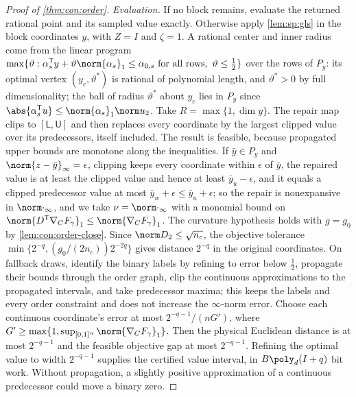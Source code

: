 \begin{proof}[Proof of \cref{thm:con:order}]
\emph{Evaluation.} If no block remains, evaluate the returned rational
point and its sampled value exactly. Otherwise apply \cref{lem:sp:gls} in the block coordinates $y$, with
$Z=I$ and $\zeta=1$. A rational center and inner radius come from the linear
program $\max\{\vartheta:\alpha_s^{\mathsf T}y+\vartheta\norm{\alpha_s}_1\le
\alpha_{0,s}\text{ for all rows},\ \vartheta\le\frac12\}$ over the rows of $P_y$:
its optimal vertex $(y_c,\vartheta^*)$ is rational of polynomial length, and
$\vartheta^*>0$ by full dimensionality; the ball of radius $\vartheta^*$ about
$y_c$ lies in $P_y$ since $\abs{\alpha_s^{\mathsf T}u}\le\norm{\alpha_s}_1\norm
u_2$. Take $R=\max\{1,\dim y\}$. The repair map clips to $[\mathsf L,\mathsf U]$
and then replaces every coordinate by the largest clipped value over its
predecessors, itself included. The result is feasible, because propagated
upper bounds are monotone along the inequalities. If $\bar y\in P_y$ and
$\norm{z-\bar y}_\infty=\epsilon$, clipping keeps every coordinate within
$\epsilon$ of $\bar y$, the repaired value is at least the clipped value and
hence at least $\bar y_u-\epsilon$, and it equals a clipped predecessor value
at most $\bar y_w+\epsilon\le\bar y_u+\epsilon$; so the repair is
nonexpansive in $\norm\cdot_\infty$, and we take $\nu=\norm\cdot_\infty$ with a
monomial bound on $\norm{D^{\mathsf T}\nabla_CF_\gamma}_1\le\norm{\nabla_CF_\gamma}_1$.
The curvature hypothesis holds with $g=g_0$ by \cref{lem:con:order-close}.
Since $\norm D_2\le\sqrt{n_c}$, the objective tolerance
$\min\{2^{-q},(g_0/(2n_c))2^{-2q}\}$ gives distance $2^{-q}$ in the original
coordinates. On fallback draws, identify the binary labels by refining to
error below $\frac12$, propagate their bounds through the order graph, clip the
continuous approximations to the propagated intervals, and take predecessor
maxima; this keeps the labels and every order constraint and does not
increase the $\infty$-norm error. Choose each continuous coordinate's error
at most $2^{-q-1}/(nG')$, where
$G'\ge\max\{1,\sup_{[0,1]^n}\norm{\nabla_CF_\gamma}_1\}$. Then the physical
Euclidean distance is at most $2^{-q-1}$ and the feasible objective gap at
most $2^{-q-1}$. Refining the optimal value to width $2^{-q-1}$ supplies the
certified value interval, in $B\poly_d(I+q)$ bit work. Without propagation,
a slightly positive approximation of a continuous predecessor could move a
binary zero.
\end{proof}
